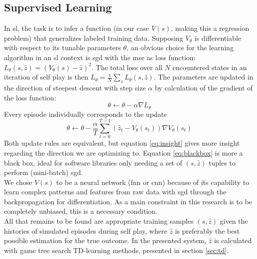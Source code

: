 \documentclass[twocolumn]{phdsymp} %
\begin{document}
\subsection{Supervised Learning}
\label{sec:sl}
In \gls{sl}, the task is to infer a function (in our case $V(s)$, making this a regression problem) that generalizes labeled training data. 
Supposing $V_\theta$ is differentiable with respect to its tunable parameters $\theta$, an obvious choice for the learning algorithm in an \gls{sl} context is \gls{sgd} with the \gls{mse} as loss function: $L_\theta(s,\hat{z})=\left(V_\theta(s)-\hat{z}\right)^2$. The total loss over all $N$ encountered states in an iteration of self play is then $L_\theta=\frac{1}{N}\sum_s L_\theta(s,\hat{z})$. The parameters are updated in the direction of steepest descent with step size $\alpha$ by calculation of the gradient of the loss function:
\begin{equation}
\theta \leftarrow \theta-\alpha\nabla L_\theta
\label{eq:blackbox}
\end{equation}
Every episode individually corresponds to the update
\begin{equation}
\theta\leftarrow \theta-\frac{\alpha}{T}\sum_{t=0}^{T-1}\left(\hat{z}_t-V_\theta(s_t)\right)\nabla V_\theta(s_t)
\label{eq:insight}
\end{equation}
Both update rules are equivalent, but equation \ref{eq:insight} gives more insight regarding the direction we are optimizing to. Equation \ref{eq:blackbox} is more a black box, ideal for software libraries only needing a set of $(s,\hat{z})$ tuples to perform (mini-batch) \gls{sgd}.\\

We chose $V(s)$ to be a neural network (\gls{fnn} or \gls{cnn}) because of its capability to learn complex patterns and features from raw data with \gls{sgd} through the backpropagation for differentiation. As a main constraint in this research is to be completely unbiased, this is a necessary condition.\\

All that remains to be found are appropriate training samples $(s,\hat{z})$ given the histories of simulated episodes during self play, where $\hat{z}$ is preferably the best possible estimation for the true outcome. In the presented system, $\hat{z}$ is calculated with game tree search TD-learning methods, presented in section \ref{sec:td}.
\end{document}
